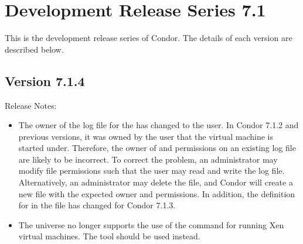 
\section{\label{sec:History-7-1}Development Release Series 7.1}

This is the development release series of Condor.
The details of each version are described below.


\subsection*{\label{sec:New-7-1-4}Version 7.1.4}

\noindent Release Notes:

\begin{itemize}

\item The owner of the log file for the 
has changed to the  user.
In Condor 7.1.2 and previous versions, it was owned by the
user that the virtual machine is started under.
Therefore, the owner of and permissions on an existing log file
are likely to be incorrect.
To correct the problem, an administrator may modify file
permissions such that the  user may read and
write the log file.
Alternatively, an administrator may delete the file, and
Condor will create a new file with the expected owner and
permissions.
In addition, the definition for 
in the  file has changed for
Condor 7.1.3.

\item The  universe no longer supports the use of 
the 
command for running Xen virtual machines. The  tool
should be used instead.

\end{itemize}


